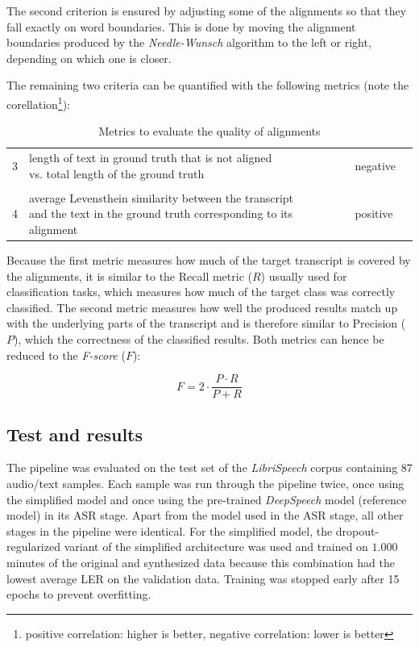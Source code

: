 The second criterion is ensured by adjusting some of the alignments so that they fall exactly on word boundaries. This is done by moving the alignment boundaries produced by the \textit{Needle-Wunsch} algorithm to the left or right, depending on which one is closer. 

The remaining two criteria can be quantified with the following metrics (note the corellation\footnote{positive correlation: higher is better, negative correlation: lower is better}):

\begin{table}[!htbp]
	\centering
	\begin{tabular}{llll}
		\toprule
		\thead{criterion} & \thead{metric} & \thead{correlation} \\
		\midrule
		3 & \makecell[l]{length of text in ground truth that is not aligned\\vs. total length of the ground truth} & negative\\ \\ 	
		4 & \makecell[l]{average Levensthein similarity between the transcript\\and the text in the ground truth corresponding to its alignment} & positive \\ 
		\bottomrule
	\end{tabular}
	\caption{Metrics to evaluate the quality of alignments}
	\label{LM_evaluation}
\end{table}

Because the first metric measures how much of the target transcript is covered by the alignments, it is similar to the Recall metric ($R$) usually used for classification tasks, which measures how much of the target class was correctly classified. The second metric measures how well the produced results match up with the underlying parts of the transcript and is therefore similar to Precision ($P$), which the correctness of the classified results. Both metrics can hence be reduced to the \textit{F-score} ($F$):

\[ 
F = 2\cdot \frac{P\cdot R}{P+R}
 \]

\subsection{Test and results}

The pipeline was evaluated on the test set of the \textit{LibriSpeech} corpus containing 87 audio/text samples. Each sample was run through the pipeline twice, once using the simplified model and once using the pre-trained \textit{DeepSpeech} model (reference model) in its \ac{ASR} stage. Apart from the model used in the \ac{ASR} stage, all other stages in the pipeline were identical. For the simplified model, the dropout-regularized variant of the simplified architecture was used and trained on $1.000$ minutes of the original and synthesized data because this combination had the lowest average \ac{LER} on the validation data. Training was stopped early after 15 epochs to prevent overfitting.

